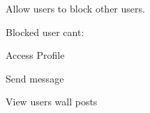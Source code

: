 Allow users to block other users.

Blocked user can\textquotesingle{}t\+:


\begin{DoxyItemize}
\item Access Profile
\item Send message
\item View users wall posts 
\end{DoxyItemize}